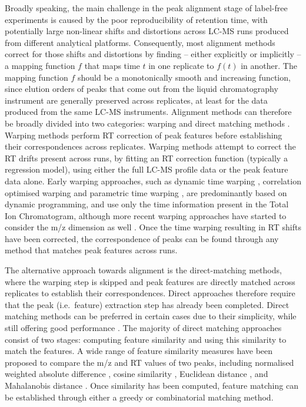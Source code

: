 Broadly speaking, the main challenge in the peak alignment stage of label-free experiments is caused by the poor reproducibility of retention time, with potentially large non-linear shifts and distortions across LC-MS runs produced from different analytical platforms. Consequently, most alignment methods correct for those shifts and distortions by finding -- either explicitly or implicitly -- a mapping function $f$ that maps time $t$ in one replicate to $f(t)$ in another. The mapping function $f$ should be a monotonically smooth and increasing function, since elution orders of peaks that come out from the liquid chromatography instrument are generally preserved across replicates, at least for the data produced from the same LC-MS instruments. Alignment methods can therefore be broadly divided into two categories: warping and direct matching methods \cite{Smith2013}. Warping methods perform RT correction of peak features before establishing their correspondences across replicates. Warping methods attempt to correct the RT drifts present across runs, by fitting an RT correction function (typically a regression model), using either the full LC-MS profile data or the peak feature data alone. Early warping approaches, such as dynamic time warping \cite{Sakoe1978}, correlation optimised warping \cite{Nielsen1998} and parametric time warping \cite{Eilers2004}, are predominantly based on dynamic programming, and use only the time information present in the Total Ion Chromatogram, although more recent warping approaches have started to consider the m/z dimension as well \cite{Christin2008}. Once the time warping resulting in RT shifts have been corrected, the correspondence of peaks can be found through any method that matches peak features across runs. 

The alternative approach towards alignment is the direct-matching methods, where the warping step is skipped and peak features are directly matched across replicates to establish their correspondences. Direct approaches therefore require that the peak (i.e.\ feature) extraction step has already been completed. Direct matching methods can be preferred in certain cases due to their simplicity, while still offering good performance \cite{Lange2008}. The majority of direct matching approaches consist of two stages: computing feature similarity and using this similarity to match the features. A wide range of feature similarity measures have been proposed to compare the m/z and RT values of two peaks, including normalised weighted absolute difference \cite{Pluskal2010}, cosine similarity \cite{Hoffmann2012a}, Euclidean distance \cite{Ballardini2011}, and Mahalanobis distance \cite{Voss2011a}. Once similarity has been computed, feature matching can be established through either a greedy or combinatorial matching method. 

